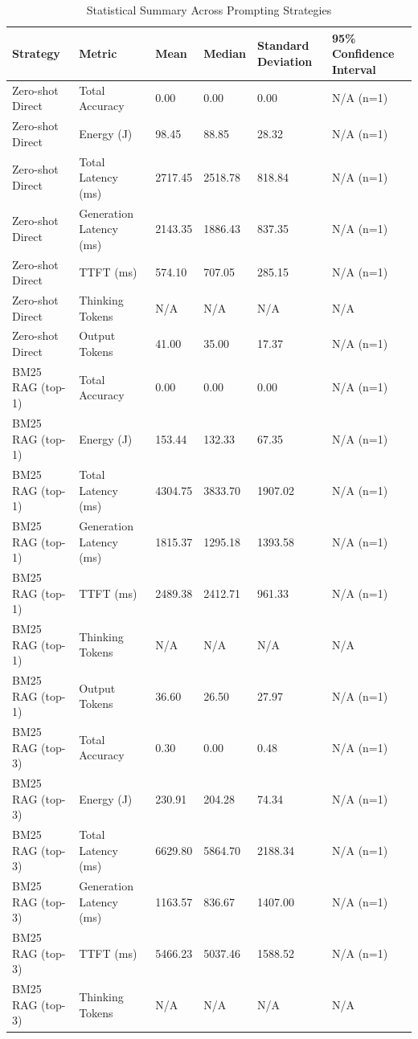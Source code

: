 \begin{table}
\caption{Statistical Summary Across Prompting Strategies}
\label{tab:statistical_summary}
\begin{tabular}{llllll}
\toprule
Strategy & Metric & Mean & Median & Standard Deviation & 95\% Confidence Interval \\
\midrule
Zero-shot Direct & Total Accuracy & 0.00 & 0.00 & 0.00 & N/A (n=1) \\
Zero-shot Direct & Energy (J) & 98.45 & 88.85 & 28.32 & N/A (n=1) \\
Zero-shot Direct & Total Latency (ms) & 2717.45 & 2518.78 & 818.84 & N/A (n=1) \\
Zero-shot Direct & Generation Latency (ms) & 2143.35 & 1886.43 & 837.35 & N/A (n=1) \\
Zero-shot Direct & TTFT (ms) & 574.10 & 707.05 & 285.15 & N/A (n=1) \\
Zero-shot Direct & Thinking Tokens & N/A & N/A & N/A & N/A \\
Zero-shot Direct & Output Tokens & 41.00 & 35.00 & 17.37 & N/A (n=1) \\
BM25 RAG (top-1) & Total Accuracy & 0.00 & 0.00 & 0.00 & N/A (n=1) \\
BM25 RAG (top-1) & Energy (J) & 153.44 & 132.33 & 67.35 & N/A (n=1) \\
BM25 RAG (top-1) & Total Latency (ms) & 4304.75 & 3833.70 & 1907.02 & N/A (n=1) \\
BM25 RAG (top-1) & Generation Latency (ms) & 1815.37 & 1295.18 & 1393.58 & N/A (n=1) \\
BM25 RAG (top-1) & TTFT (ms) & 2489.38 & 2412.71 & 961.33 & N/A (n=1) \\
BM25 RAG (top-1) & Thinking Tokens & N/A & N/A & N/A & N/A \\
BM25 RAG (top-1) & Output Tokens & 36.60 & 26.50 & 27.97 & N/A (n=1) \\
BM25 RAG (top-3) & Total Accuracy & 0.30 & 0.00 & 0.48 & N/A (n=1) \\
BM25 RAG (top-3) & Energy (J) & 230.91 & 204.28 & 74.34 & N/A (n=1) \\
BM25 RAG (top-3) & Total Latency (ms) & 6629.80 & 5864.70 & 2188.34 & N/A (n=1) \\
BM25 RAG (top-3) & Generation Latency (ms) & 1163.57 & 836.67 & 1407.00 & N/A (n=1) \\
BM25 RAG (top-3) & TTFT (ms) & 5466.23 & 5037.46 & 1588.52 & N/A (n=1) \\
BM25 RAG (top-3) & Thinking Tokens & N/A & N/A & N/A & N/A \\

\end{tabular}
\end{table}
